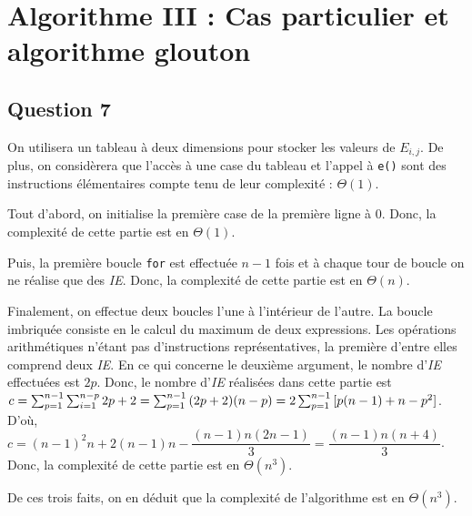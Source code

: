 \documentclass[12pt,a4paper]{article}
\begin{document}
\section{Algorithme III : Cas particulier et algorithme glouton}

\subsection*{Question 7}
On utilisera un tableau \`a deux dimensions pour stocker les valeurs de \( E_{i,j} \). De plus, on consid\`erera que l'acc\`es \`a une case du tableau et l'appel \`a \texttt{e()} sont des instructions \'el\'ementaires  compte tenu de leur complexit\'e : $\Theta(1)$. 

Tout d'abord, on initialise la premi\`ere case de la premi\`ere ligne \`a 0. Donc, la complexit\'e de cette partie est en $\Theta(1)$. 

Puis, la premi\`ere boucle \texttt{for} est effectu\'ee \( n-1 \) fois et \`a chaque tour de boucle on ne r\'ealise que des {\itshape IE}. Donc, la complexit\'e de cette partie est en $\Theta(n)$. 

Finalement, on effectue deux boucles l'une \`a l'int\'erieur de l'autre. La boucle imbriqu\'ee consiste en le calcul du maximum de deux expressions. Les op\'erations arithm\'etiques n'\'etant pas d'instructions repr\'esentatives, la premi\`ere d'entre elles comprend deux {\itshape IE}. En ce qui concerne le deuxi\`eme argument, le nombre d'{\itshape IE} effectu\'ees est \( 2p \). Donc, le nombre d'{\itshape IE} r\'ealis\'ees dans cette partie est \( \\c = \sum_{p=1}^{n-1}\sum_{i=1}^{n-p}{2p+2} = \sum_{p=1}^{n-1}{(2p+2)(n-p)} = 2\sum_{p=1}^{n-1}{[p(n-1)+n-p^2]} \). D'o\`u, \( c = (n-1)^2n + 2(n-1)n - \dfrac{(n-1)n(2n-1)}{3} = \dfrac{(n-1)n(n+4)}{3} \). Donc, la complexit\'e de cette partie est en $\Theta(n^3)$.

De ces trois faits, on en d\'eduit que la complexit\'e de l'algorithme est en $\Theta(n^3)$.

\lstset{language=Python,inputencoding=utf8/latin1}
\end{document}
